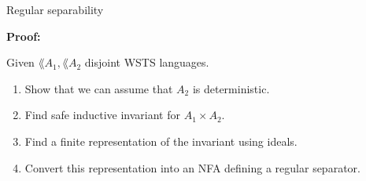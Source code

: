 \documentclass[../talk.tex]{subfiles}
\begin{document}
\begin{frame}{Regular separability}
\begin{overlayarea}{\slidewidth}{\slideheight}
{        }
        {%
            \textbf{Proof:}

            Given $\lang{A_1}, \lang{A_2}$ disjoint WSTS languages.

            \begin{enumerate}
                \item Show that we can assume \wolog that $A_2$ is \alert{deterministic}.
                \item Find  \alert{safe inductive invariant} for $A_1 \times A_2$.
                \item Find a \alert{finite representation} of the invariant using \alert{ideals}.
                \item Convert this representation into an NFA defining a regular separator.
            \end{enumerate}
        }
    \end{overlayarea}
\end{frame}
\end{document}
